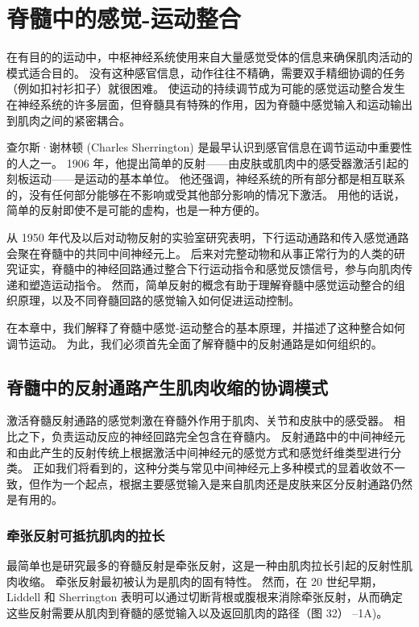 \chapter{脊髓中的感觉-运动整合} \label{chap:chap32}
在有目的的运动中，中枢神经系统使用来自大量感觉受体的信息来确保肌肉活动的模式适合目的。
没有这种感官信息，动作往往不精确，需要双手精细协调的任务（例如扣衬衫扣子）就很困难。
使运动的持续调节成为可能的感觉运动整合发生在神经系统的许多层面，但脊髓具有特殊的作用，因为脊髓中感觉输入和运动输出到肌肉之间的紧密耦合。


查尔斯·谢林顿 (Charles Sherrington) 是最早认识到感官信息在调节运动中重要性的人之一。
1906 年，他提出简单的反射——由皮肤或肌肉中的感受器激活引起的刻板运动——是运动的基本单位。
他还强调，神经系统的所有部分都是相互联系的，没有任何部分能够在不影响或受其他部分影响的情况下激活。
用他的话说，简单的反射即使不是可能的虚构，也是一种方便的。


从 1950 年代及以后对动物反射的实验室研究表明，下行运动通路和传入感觉通路会聚在脊髓中的共同中间神经元上。
后来对完整动物和从事正常行为的人类的研究证实，脊髓中的神经回路通过整合下行运动指令和感觉反馈信号，参与向肌肉传递和塑造运动指令。
然而，简单反射的概念有助于理解脊髓中感觉运动整合的组织原理，以及不同脊髓回路的感觉输入如何促进运动控制。


在本章中，我们解释了脊髓中感觉-运动整合的基本原理，并描述了这种整合如何调节运动。
为此，我们必须首先全面了解脊髓中的反射通路是如何组织的。



\section{脊髓中的反射通路产生肌肉收缩的协调模式}
激活脊髓反射通路的感觉刺激在脊髓外作用于肌肉、关节和皮肤中的感受器。
相比之下，负责运动反应的神经回路完全包含在脊髓内。 
反射通路中的中间神经元和由此产生的反射传统上根据激活中间神经元的感觉方式和感觉纤维类型进行分类。
正如我们将看到的，这种分类与常见中间神经元上多种模式的显着收敛不一致，但作为一个起点，根据主要感觉输入是来自肌肉还是皮肤来区分反射通路仍然是有用的。



\subsection{牵张反射可抵抗肌肉的拉长}

最简单也是研究最多的脊髓反射是牵张反射，这是一种由肌肉拉长引起的反射性肌肉收缩。
牵张反射最初被认为是肌肉的固有特性。
然而，在 20 世纪早期，Liddell 和 Sherrington 表明可以通过切断背根或腹根来消除牵张反射，从而确定这些反射需要从肌肉到脊髓的感觉输入以及返回肌肉的路径（图 32） –1A)。


